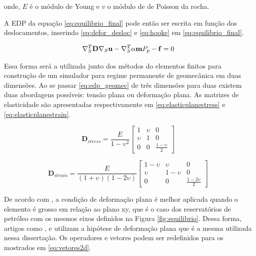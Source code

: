 onde, $E$ é o módulo de Young e $v$ o módulo de de Poisson da rocha.


A EDP da equação \eqref{eq:equilibrio_final} pode então ser escrita em função dos deslocamentos, inserindo \eqref{eq:defor_desloc} e \eqref{eq:hooke} em  \eqref{eq:equilibrio_final}.

\begin{equation}
\label{eq:edp_geomec}
\nabla_S^T \mathbf{D} \nabla_S \mathbf{u} - \nabla_S^T\alpha \mathbf{m} P_p - \mathbf{f} = 0
\end{equation}

 Essa forma será a utilizada junto dos métodos do elementos finitos para construção de um simulador para regime permanente de geomecânica em duas dimensões. Ao se passar \eqref{eq:edp_geomec} de três dimensões para duas existem duas abordagens possíveis: tensão plana ou deformação plana. As matrizes de elasticidade são apresentadas respectivamente em \eqref{eq:elasticplanestress} e \eqref{eq:elasticplanestrain}.

\begin{equation} \label{eq:elasticplanestress}
\mathbf{D}_{stress} = \frac{E}{1-\upsilon^2}
\begin{bmatrix}
1  & \upsilon & 0 \\
\upsilon & 1 &  0 \\
0 & 0 & \frac{1-\upsilon}{2}
\end{bmatrix}
\end{equation}

\begin{equation} \label{eq:elasticplanestrain}
\mathbf{D}_{strain} = \frac{E}{(1+\upsilon)(1-2\upsilon)}
\begin{bmatrix}
 1-\upsilon & \upsilon    &  0 \\
 \upsilon   &  1-\upsilon &  0 \\
 0& 0 & \frac{1-2\upsilon}{2}
\end{bmatrix}
\end{equation}

De acordo com \citet{jacob}, a condição de deformação plana é melhor aplicada quando o elemento é grosso em relação ao plano xy, que é o caso dos reservatórios de petróleo com os mesmos eixos definidos na Figura \ref{fig:equilibrio}. Dessa forma, artigos como \cite{casteletto}, \cite{planeStrainProblems} e \cite{irina} utilizam a hipótese de deformação plana que é a mesma utilizada nessa dissertação. Os operadores e vetores podem ser redefinidos para os mostrados em \eqref{eq:vetores2d}.

